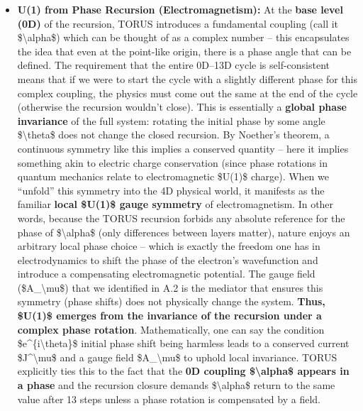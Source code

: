 \documentclass[
]{article}
\begin{document}
\begin{itemize}
\item
  \textbf{U(1) from Phase Recursion (Electromagnetism):} At the
  \textbf{base level (0D)} of the recursion, TORUS introduces a
  fundamental coupling (call it \$\textbackslash alpha\$) which can be
  thought of as a complex number -- this encapsulates the idea that even
  at the point-like origin, there is a phase angle that can be defined.
  The requirement that the entire 0D--13D cycle is self-consistent means
  that if we were to start the cycle with a slightly different phase for
  this complex coupling, the physics must come out the same at the end
  of the cycle (otherwise the recursion wouldn't close)\hspace{0pt}.
  This is essentially a \textbf{global phase invariance} of the full
  system: rotating the initial phase by some angle
  \$\textbackslash theta\$ does not change the closed recursion. By
  Noether's theorem, a continuous symmetry like this implies a conserved
  quantity -- here it implies something akin to electric charge
  conservation (since phase rotations in quantum mechanics relate to
  electromagnetic \$U(1)\$ charge). When we ``unfold'' this symmetry
  into the 4D physical world, it manifests as the familiar \textbf{local
  \$U(1)\$ gauge symmetry} of electromagnetism\hspace{0pt}. In other
  words, because the TORUS recursion forbids any absolute reference for
  the phase of \$\textbackslash alpha\$ (only differences between layers
  matter), nature enjoys an arbitrary local phase choice -- which is
  exactly the freedom one has in electrodynamics to shift the phase of
  the electron's wavefunction and introduce a compensating
  electromagnetic potential. The gauge field (\$A\_\textbackslash mu\$)
  that we identified in A.2 is the mediator that ensures this symmetry
  (phase shifts) does not physically change the system. \textbf{Thus,
  \$U(1)\$ emerges from the invariance of the recursion under a complex
  phase rotation}. Mathematically, one can say the condition
  \$e\^{}\{i\textbackslash theta\}\$ initial phase shift being harmless
  leads to a conserved current \$J\^{}\textbackslash mu\$ and a gauge
  field \$A\_\textbackslash mu\$ to uphold local invariance. TORUS
  explicitly ties this to the fact that the \textbf{0D coupling
  \$\textbackslash alpha\$ appears in a phase} and the recursion closure
  demands \$\textbackslash alpha\$ return to the same value after 13
  steps unless a phase rotation is compensated by a field\hspace{0pt}.

\end{itemize}
\end{document}
